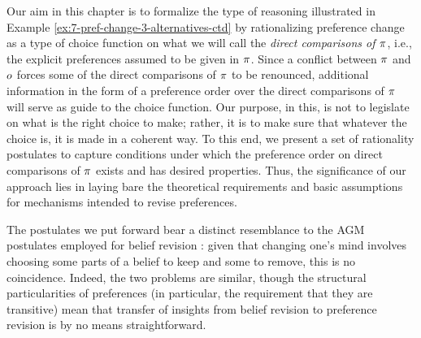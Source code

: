 Our aim in this chapter is to formalize the type of 
reasoning illustrated in Example \ref{ex:7-pref-change-3-alternatives-ctd}
by rationalizing preference change as a type of choice function 
on what we will call the \emph{direct comparisons of $\pi$},
i.e., the explicit preferences assumed to be given in $\pi$.
Since a conflict between $\pi$ and $o$ forces some of the direct comparisons of $\pi$
to be renounced, additional information in the form of a preference order over the direct comparisons
of $\pi$ will serve as guide to the choice function.
Our purpose, in this, is not to legislate on what is the right choice to make;
rather, it is to make sure that whatever the choice is, it is made in a coherent way.
To this end, we present a set of rationality postulates 
to capture conditions under which the preference order on direct comparisons of $\pi$ 
exists and has desired properties.
Thus, the significance of our approach lies in laying bare the theoretical requirements
and basic assumptions for mechanisms intended to revise preferences.

The postulates we put forward bear a distinct resemblance to the AGM postulates 
employed for belief revision
\cite{AlchourronGM85,KatsunoM92,Hansson17,FermeH18}:
given that changing one's mind involves choosing some parts 
of a belief to keep and some to remove,
this is no coincidence. 
Indeed, the two problems are similar, 
though the structural particularities of preferences
(in particular, the requirement that they are transitive) 
mean that transfer of insights from belief revision 
to preference revision is by no means straightforward.



